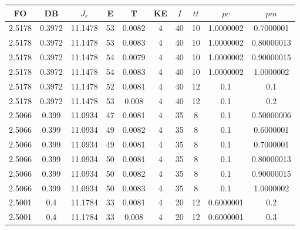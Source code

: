 \begin{table}[h!]
    \footnotesize
    \begin{center}
        \begin{tabular}{|c|c|c|c|c|c|c|c|c|c|}
        \hline
            {\bf FO} & {\bf DB} & $J_e$ & {\bf E} & {\bf T} & {\bf KE} & $I$ & $tt$ & $pc$ & $pm$ \\
        \hline
        \hline
            2.5178 & 0.3972  & 11.1478 & 53 & 0.0082 & 4 & 40 & 10 & 1.0000002 & 0.7000001\\
        \hline
        \hline
            2.5178 & 0.3972  & 11.1478 & 53 & 0.0083 & 4 & 40 & 10 & 1.0000002 & 0.80000013\\
        \hline
        \hline
            2.5178 & 0.3972  & 11.1478 & 54 & 0.0079 & 4 & 40 & 10 & 1.0000002 & 0.90000015\\
        \hline
        \hline
            2.5178 & 0.3972  & 11.1478 & 54 & 0.0083 & 4 & 40 & 10 & 1.0000002 & 1.0000002\\
        \hline
        \hline
            2.5178 & 0.3972  & 11.1478 & 52 & 0.0081 & 4 & 40 & 12 & 0.1 & 0.1\\
        \hline
        \hline
            2.5178 & 0.3972  & 11.1478 & 53 & 0.008 & 4 & 40 & 12 & 0.1 & 0.2\\
        \hline
        \hline
            2.5066 & 0.399  & 11.0934 & 47 & 0.0081 & 4 & 35 & 8 & 0.1 & 0.50000006\\
        \hline
        \hline
            2.5066 & 0.399  & 11.0934 & 49 & 0.0082 & 4 & 35 & 8 & 0.1 & 0.6000001\\
        \hline
        \hline
            2.5066 & 0.399  & 11.0934 & 49 & 0.0081 & 4 & 35 & 8 & 0.1 & 0.7000001\\
        \hline
        \hline
            2.5066 & 0.399  & 11.0934 & 50 & 0.0081 & 4 & 35 & 8 & 0.1 & 0.80000013\\
        \hline
        \hline
            2.5066 & 0.399  & 11.0934 & 50 & 0.0082 & 4 & 35 & 8 & 0.1 & 0.90000015\\
        \hline
        \hline
            2.5066 & 0.399  & 11.0934 & 50 & 0.0083 & 4 & 35 & 8 & 0.1 & 1.0000002\\
        \hline
        \hline
            2.5001 & 0.4  & 11.1784 & 33 & 0.0081 & 4 & 20 & 12 & 0.6000001 & 0.2\\
        \hline
        \hline
            2.5001 & 0.4  & 11.1784 & 33 & 0.008 & 4 & 20 & 12 & 0.6000001 & 0.3\\
        \hline
        \hline

\end{tabular}
\end{center}
\end{table}
